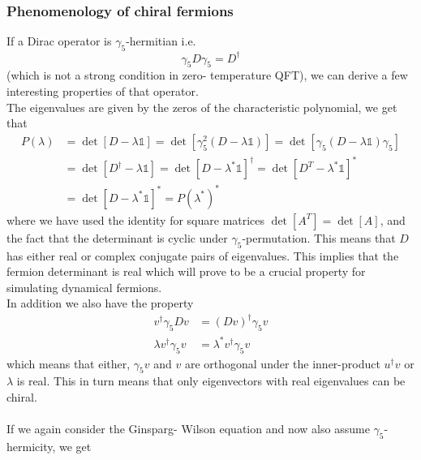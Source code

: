 \documentclass[a4paper,10pt]{article}
\begin{document}
\subsubsection{Phenomenology of chiral fermions}
If a Dirac operator is $\gamma_5$-hermitian i.e.
\begin{equation}
\gamma_{5} D \gamma_{5}=D^{\dagger}
\end{equation}
(which is not a strong condition in zero- temperature QFT), we can derive a few interesting properties of that operator.\\The eigenvalues are given by the zeros of the characteristic polynomial, we get that
\begin{equation}
\begin{aligned}
P(\lambda) &=\operatorname{det}[D-\lambda \mathbb{1}]=\operatorname{det}\left[\gamma_{5}^{2}(D-\lambda \mathbb{1})\right]=\operatorname{det}\left[\gamma_{5}(D-\lambda \mathbb{1}) \gamma_{5}\right] \\
&=\operatorname{det}\left[D^{\dagger}-\lambda \mathbb{1}\right]=\operatorname{det}\left[D-\lambda^{*} \mathbb{1}\right]^{\dagger}=\operatorname{det}\left[D^T-\lambda^{*} \mathbb{1}\right]^{*}\\&=\operatorname{det}\left[D-\lambda^{*} \mathbb{1}\right]^{*}=P\left(\lambda^{*}\right)^{*}
\end{aligned}
\end{equation}
where we have used the identity for square matrices $\operatorname{det}\left[ A^T \right] = \operatorname{det}\left[ A \right]$, and the fact that the determinant is cyclic under $\gamma_5$-permutation. This means that $D$ has either real or complex conjugate pairs of eigenvalues. This implies that the fermion determinant is real which will prove to be a crucial property for simulating dynamical fermions.\\In addition we also have the property
\begin{equation}
\begin{aligned} 
v^\dagger \gamma_5Dv &= (Dv)^\dagger\gamma_5v\\\lambda v^\dagger \gamma_5v &=\lambda^*v^\dagger \gamma_5v 
\end{aligned}
\end{equation}
which means that either, $\gamma_5v $ and $v$ are orthogonal under the inner-product $u^\dagger v$ or $\lambda$ is real. This in turn means that only eigenvectors with real eigenvalues can be chiral.\\\\
If we again consider the Ginsparg- Wilson equation and now also assume $\gamma_5$-hermicity, we get
\end{document}

